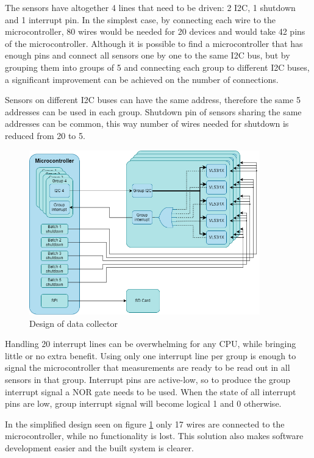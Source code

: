 The sensors have altogether 4 lines that need to be driven: 2 I2C, 1 shutdown and 1 interrupt pin.
In the simplest case, by connecting each wire to the microcontroller, 80 wires would be needed for 
20 devices and would take 42 pins of the microcontroller. Although it is possible to find a microcontroller 
that has enough pins and connect all sensors one by one to the same I2C bus, but by grouping them 
into groups of 5 and connecting each group to different I2C buses, a significant improvement can be 
achieved on the number of connections. 

Sensors on different I2C buses can have the same address, therefore the same 5 addresses can be used
in each group. Shutdown pin of sensors sharing the same addresses can be common, this way number of
wires needed for shutdown is reduced from 20 to 5.

\begin{figure}[ht]
    \centering
    \includegraphics[width=100mm, keepaspectratio]{figures/data_collector.png}
    \caption{Design of data collector}
    \label{fig:data_collector}
\end{figure}

Handling 20 interrupt lines can be overwhelming for any CPU, while bringing little or no extra
benefit. Using only one interrupt line per group is enough to signal the microcontroller that 
measurements are ready to be read out in all sensors in that group. Interrupt pins are active-low,
so to produce the group interrupt signal a NOR gate needs to be used. When the state of all interrupt
pins are low, group interrupt signal will become logical 1 and 0 otherwise.

In the simplified design seen on figure \ref{fig:data_collector} only 17 wires are connected to
the microcontroller, while no functionality is lost. This solution also makes software development
easier and the built system is clearer.




